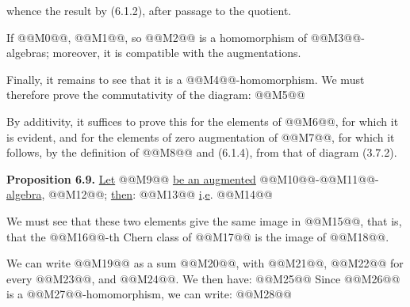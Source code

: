 whence the result by (6.1.2), after passage to the quotient.

If @@M0@@, @@M1@@, so @@M2@@ is a homomorphism of @@M3@@-algebras; moreover, it is compatible with the augmentations.

Finally, it remains to see that it is a @@M4@@-homomorphism. We must therefore prove the commutativity of the diagram:
@@M5@@

By additivity, it suffices to prove this for the elements of @@M6@@, for which it is evident, and for the elements of zero augmentation of @@M7@@, for which it follows, by the definition of @@M8@@ and (6.1.4), from that of diagram (3.7.2).

\textbf{Proposition 6.9.} \uline{Let} @@M9@@ \uline{be an augmented} @@M10@@-@@M11@@-\uline{algebra}, @@M12@@; \uline{then}:
@@M13@@
\uline{i}.\uline{e}.
@@M14@@

We must see that these two elements give the same image in @@M15@@, that is, that the @@M16@@-th Chern class of @@M17@@ is the image of @@M18@@.

We can write @@M19@@ as a sum @@M20@@, with @@M21@@, @@M22@@ for every @@M23@@, and @@M24@@. We then have:
@@M25@@
Since @@M26@@ is a @@M27@@-homomorphism, we can write:
@@M28@@
